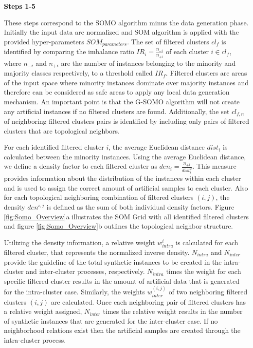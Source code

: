 \documentclass[parskip=full]{scrartcl}
\begin{document}
\textbf{Steps 1-5} 

These steps correspond to the SOMO algorithm minus the data generation phase.
Initially the input data are normalized and SOM algorithm is applied with the
provided hyper-parameters $SOM_{parameters}$. The set of filtered clusters
$cl_{f}$ is identified by comparing the imbalance ratio $IR_{i} =
\frac{n_{-i}}{n_{+i}}$ of each cluster $i \in cl_{f}$, where $n_{-i}$ and
$n_{+i}$ are the number of instances belonging to the minority and majority
classes respectively, to a threshold called $IR_{f}$. Filtered clusters are
areas of the input space where minority instances dominate over majority
instances and therefore can be considered as safe areas to apply any local data
generation mechanism. An important point is that the G-SOMO algorithm will not
create any artificial instances if no filtered clusters are found. Additionally,
the set $cl_{f, n}$ of neighboring filtered clusters pairs is identified by
including only pairs of filtered clusters that are topological neighbors.

For each identified filtered cluster $i$, the average Euclidean distance
$dist_{i}$ is calculated between the minority instances. Using the average
Euclidean distance, we define a density factor to each filtered cluster as
$den_{i} = \frac{n_{+i}}{dist_{i}^2}$. This measure provides information about
the distribution of the instances within each cluster and is used to assign the
correct amount of artificial samples to each cluster. Also for each topological
neighboring combination of filtered clusters $(i, j)$, the density $den^{i, j}$
is defined as the sum of both individual density factors. Figure
\ref{fig:Somo_Overview}a illustrates the SOM Grid with all identified filtered
clusters and figure \ref{fig:Somo_Overview}b outlines the topological neighbor
structure.

Utilizing the density information, a relative weight $w^{i}_{intra}$ is
calculated for each filtered cluster, that represents the normalized inverse
density. $N_{intra}$ and $N_{inter}$ provide the guideline of the total
synthetic instances to be created in the intra-cluster and inter-cluster
processes, respectively. $N_{intra}$ times the weight for each specific filtered
cluster results in the amount of artificial data that is generated for the
intra-cluster case. Similarly, the weights $w^{(i, j)}_{inter}$ of two
neighboring filtered clusters $(i, j)$ are calculated. Once each neighboring
pair of filtered clusters has a relative weight assigned, $N_{inter}$ times the
relative weight results in the number of synthetic instances that are generated
for the inter-cluster case. If no neighborhood relations exist then the
artificial samples are created through the intra-cluster process.
\end{document}
